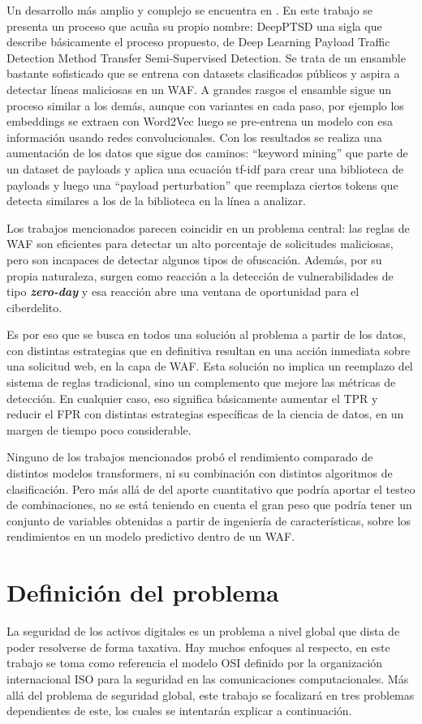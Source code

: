 \documentclass[12pt]{article}
\begin{document}
Un desarrollo más amplio y complejo se encuentra en \cite{chen2021payload}. En este trabajo se presenta un proceso que acuña su propio nombre: DeepPTSD una sigla que describe básicamente el proceso propuesto, de Deep Learning Payload Traffic Detection Method Transfer Semi-Supervised Detection. Se trata de un ensamble bastante sofisticado que se entrena con datasets clasificados públicos y aspira a detectar líneas maliciosas en un WAF. A grandes rasgos el ensamble sigue un proceso similar a los demás, aunque con variantes en cada paso, por ejemplo los embeddings se extraen con Word2Vec luego se pre-entrena un modelo con esa información usando redes convolucionales. Con los resultados se realiza una aumentación de los datos que sigue dos caminos: \enquote{keyword mining} que parte de un dataset de payloads y aplica una ecuación tf-idf para crear una biblioteca de payloads y luego una \enquote{payload perturbation} que reemplaza ciertos tokens que detecta similares a los de la biblioteca en la línea a analizar.

Los trabajos mencionados parecen coincidir en un problema central: las reglas de WAF son eficientes para detectar un alto porcentaje de solicitudes maliciosas, pero son incapaces de detectar algunos tipos de ofuscación. Además, por su propia naturaleza, surgen como reacción a la detección de vulnerabilidades de tipo \textbf{\textit{zero-day}} y esa reacción abre una ventana de oportunidad para el ciberdelito.

Es por eso que se busca en todos una solución al problema a partir de los datos, con distintas estrategias que en definitiva resultan en una acción inmediata sobre una solicitud web, en la capa de WAF. Esta solución no implica un reemplazo del sistema de reglas tradicional, sino un complemento que mejore las métricas de detección. En cualquier caso, eso significa básicamente aumentar el TPR y reducir el FPR con distintas estrategias específicas de la ciencia de datos, en un margen de tiempo poco considerable.

Ninguno de los trabajos mencionados probó el rendimiento comparado de distintos modelos transformers, ni su combinación con distintos algoritmos de clasificación. Pero más allá de del aporte cuantitativo que podría aportar el testeo de combinaciones, no se está teniendo en cuenta el gran peso que podría tener un conjunto de variables obtenidas a partir de ingeniería de características, sobre los rendimientos en un modelo predictivo dentro de un WAF.

\section{Definición del problema}
\label{sec:definicion-problema}
La seguridad de los activos digitales es un problema a nivel global que dista de poder resolverse de forma taxativa. Hay muchos enfoques al respecto, en este trabajo se toma como referencia el modelo OSI \cite{day1983osi} definido por la organización internacional ISO para la seguridad en las comunicaciones computacionales. Más allá del problema de seguridad global, este trabajo se focalizará en tres problemas dependientes de este, los cuales se intentarán explicar a continuación.
\end{document}
